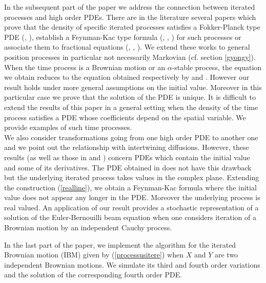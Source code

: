 \documentclass[a4paper, 11pt]{article}
\newcommand{\1}{\mathbf{1}}
\begin{document}
\noindent In the subsequent part of the paper we address the connection between iterated processes and high order PDEs. There are in the literature several papers which prove that the density of specific iterated processes satisfies a Fokker-Planck type PDE (\cite{orsingher2}, \cite{orsingher}), establish a Feynman-Kac type formula (\cite{allouba}, \cite{funaki}, \cite{erkan}) for such processes or associate them to fractional equations (\cite{baeumer}, \cite{erkan2}, \cite{orsingher3}). We extend these works to general position processes in particular not necessarily Markovian (cf. section \ref{gyongy}).\\
When the time process is a Brownian motion or an $\alpha$-stable process, the equation we obtain reduces to the equation obtained respectively by \cite{allouba} and \cite{erkan}. However our result holds under more general assumptions on the initial value. Moreover in this particular case we prove that the solution of the PDE is unique. It is difficult to extend the results of this paper in a general setting when the density of the time process satisfies a PDE whose coefficients depend on the spatial variable. We provide examples of such time processes. \\
We also consider transformations going from one high order PDE to another one and we point out the relationship with intertwining diffusions. However, these results (as well as those in \cite{allouba} and \cite{erkan}) concern PDEs which contain the initial value and some of its derivatives. The PDE obtained in \cite{funaki} does not have this drawback but the underlying iterated process takes values in the complex plane. Extending the construction (\ref{realline}), we obtain a Feynman-Kac formula where the initial value does not appear any longer in the PDE. Moreover the underlying process is real valued. An application of our result provides a stochastic representation of a solution of the Euler-Bernouilli beam equation when one considers iteration of a Brownian motion by an independent Cauchy process.



\smallskip

\noindent In the last part of the paper, we implement the algorithm for the iterated Brownian motion (IBM) given by (\ref{processusitere}) when $X$ and $Y$ are two independent Brownian motions. We simulate its third and fourth order variations and the solution of the corresponding fourth order PDE.

\bigskip
\end{document}

